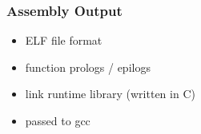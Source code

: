 \documentclass[navbaroff,en]{sdqbeamer}
\begin{document}
\begin{frame}
    \frametitle{Assembly Output}

    \begin{itemize}
        \item ELF file format
        \item function prologs / epilogs
        \item link runtime library (written in C)
        \item passed to gcc
    \end{itemize}

\end{frame}


\begin{frame}
\end{frame}

\appendix
\beginbackup

\backupend
\end{document}

